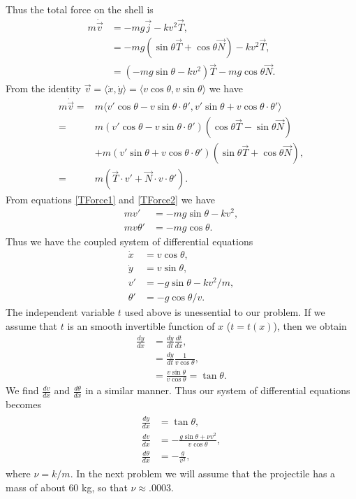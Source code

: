Thus the total force on the shell is 
\begin{align}
m \dot{\vec{v}} &= -mg \vec{j} - kv^2 \vec{T},\nonumber \\
&= -mg( \sin{\theta} \vec{T} + \cos{\theta} \vec{N} ) - kv^2 \vec{T},\nonumber\\
&= (-mg \sin{\theta} - k v^2 ) \vec{T} - mg \cos{\theta} \vec{N}.\label{TForce1}
\end{align}
From the identity 
$\vec{v} = \langle \dot{x}, \dot{y} \rangle = \langle v \cos{\theta}, v \sin{\theta} \rangle$ 
we have 
\begin{align}
m \dot{\vec{v}} = {} & m\langle v' \cos{\theta} - v\sin{\theta} \cdot \theta' ,v'\sin{\theta} + v\cos{\theta} \cdot \theta' \rangle \nonumber \\
= {} & m(v'\cos{\theta} - v\sin{\theta} \cdot \theta')(\cos{\theta} \vec{T} - \sin{\theta}\vec{N}) \nonumber \\
& + m(v' \sin{\theta} + v\cos{\theta} \cdot \theta')( \sin{\theta} \vec{T} + \cos{\theta} \vec{N}) ,  \nonumber \\
= {} & m(\vec{T} \cdot v' + \vec{N} \cdot v \cdot \theta') . \label{TForce2}
\end{align}
From equations \eqref{TForce1} and \eqref{TForce2} we have 
\begin{align*}
mv' &= -mg\sin{\theta} - k v^2,\\
mv\theta' &= -mg \cos{\theta}.
\end{align*}
Thus we have the coupled system of differential equations
\begin{align}
\dot{x} &= v\cos{\theta}, \nonumber \\
\dot{y} &= v\sin{\theta},\nonumber \\
v' &= -g\sin{\theta} -  k v^2/m,\nonumber \\
\theta' &= -g \cos{\theta}/v. \nonumber
\end{align}
The independent variable $t$ used above is unessential to our problem. If we assume that $t$ is an smooth invertible function of $x$ ($t = t(x)$), then we obtain 
\begin{align*}
\frac{dy}{dx} &= \frac{dy}{dt}\frac{dt}{dx} ,\\
&= \frac{dy}{dt} \frac{1}{v\cos{\theta}}, \\
&= \frac{v \sin{\theta}}{v\cos{\theta}} = \tan{\theta}.
\end{align*}
We find $\frac{dv}{dx}$ and $\frac{d\theta}{dx}$ in a similar manner. 
Thus our system of differential equations becomes 
\begin{align}
	\begin{split}
\frac{dy}{dx} &= \tan {\theta} ,\\
\frac{dv}{dx} &= -\frac{g \sin{\theta} + \nu v^2}{v \cos{\theta}},\\
\frac{d\theta}{dx} &= -\frac{g}{v^2}, \label{cannon_DEs}
	\end{split}
\end{align}
where $\nu = k/m.$ In the next problem we will assume that the projectile has a mass of about $60$ kg, so that $\nu \approx .0003$.




